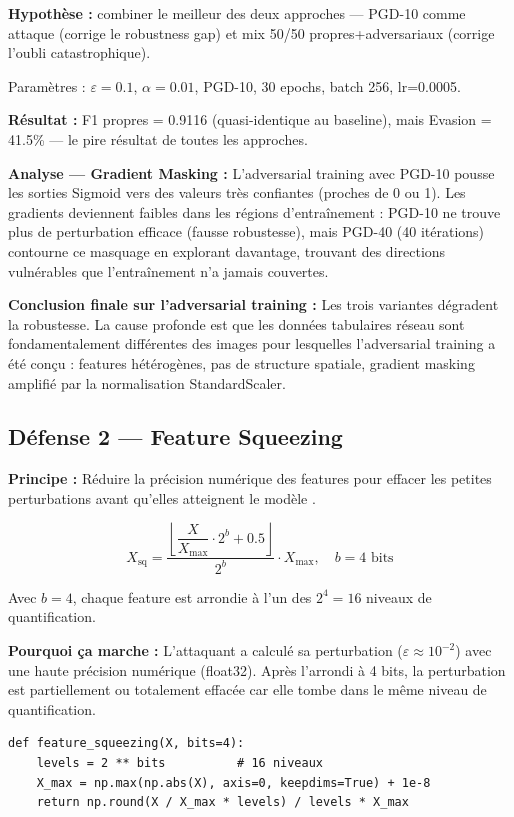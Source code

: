 \documentclass[11pt,a4paper]{article}
\begin{document}
\textbf{Hypoth\`ese :} combiner le meilleur des deux approches --- PGD-10 comme attaque
(corrige le robustness gap) et mix 50/50 propres+adversariaux (corrige l'oubli catastrophique).

Param\`etres : $\varepsilon=0.1$, $\alpha=0.01$, PGD-10, 30 epochs, batch 256, lr=0.0005.

\textbf{R\'esultat :} F1 propres = 0.9116 (quasi-identique au baseline), mais Evasion = \alert{41.5\%} ---
le pire r\'esultat de toutes les approches.

\textbf{Analyse --- Gradient Masking :}
L'adversarial training avec PGD-10 pousse les sorties Sigmoid vers des valeurs tr\`es confiantes
(proches de 0 ou 1). Les gradients deviennent faibles dans les r\'egions d'entra\^inement :
PGD-10 ne trouve plus de perturbation efficace (fausse robustesse),
mais PGD-40 (40 it\'erations) contourne ce masquage en explorant davantage,
trouvant des directions vuln\'erables que l'entra\^inement n'a jamais couvertes.

\textbf{Conclusion finale sur l'adversarial training :}
Les trois variantes d\'egradent la robustesse. La cause profonde est que les donn\'ees tabulaires
r\'eseau sont fondamentalement diff\'erentes des images pour lesquelles l'adversarial training
a \'et\'e con\c{c}u : features h\'et\'erog\`enes, pas de structure spatiale, gradient masking
amplifi\'e par la normalisation StandardScaler.

\subsection{D\'efense 2 --- Feature Squeezing}

\textbf{Principe :} R\'eduire la pr\'ecision num\'erique des features pour effacer les petites
perturbations avant qu'elles atteignent le mod\`ele \cite{xu2018}.

\[
X_{\text{sq}} = \frac{\left\lfloor \dfrac{X}{X_{\max}} \cdot 2^b + 0.5 \right\rfloor}{2^b} \cdot X_{\max},
\quad b = 4 \text{ bits}
\]

Avec $b=4$, chaque feature est arrondie \`a l'un des $2^4 = 16$ niveaux de quantification.

\textbf{Pourquoi \c{c}a marche :} L'attaquant a calcul\'e sa perturbation ($\varepsilon \approx 10^{-2}$)
avec une haute pr\'ecision num\'erique (float32). Apr\`es l'arrondi \`a 4 bits, la perturbation est
partiellement ou totalement effac\'ee car elle tombe dans le m\^eme niveau de quantification.

\begin{lstlisting}[caption={Impl\'ementation du Feature Squeezing}]
def feature_squeezing(X, bits=4):
    levels = 2 ** bits          # 16 niveaux
    X_max = np.max(np.abs(X), axis=0, keepdims=True) + 1e-8
    return np.round(X / X_max * levels) / levels * X_max
\end{lstlisting}
\end{document}
